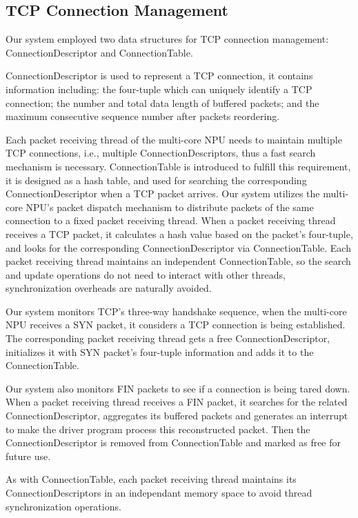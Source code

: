 \documentclass[conference]{IEEEtran}
\begin{document}
\subsection{TCP Connection Management}
Our system employed two data structures for TCP connection management: ConnectionDescriptor and ConnectionTable.

ConnectionDescriptor is used to represent a TCP connection, it contains information including: the four-tuple which can uniquely identify a TCP connection; the number and total data length of buffered packets; and the maximum consecutive sequence number after packets reordering.

Each packet receiving thread of the multi-core NPU needs to maintain multiple TCP connections, i.e., multiple ConnectionDescriptors, thus a fast search mechanism is necessary. ConnectionTable is introduced to fulfill this requirement, it is designed as a hash table, and used for searching the corresponding ConnectionDescriptor when a TCP packet arrives. Our system utilizes the multi-core NPU's packet dispatch mechanism to distribute packets of the same connection to a fixed packet receiving thread. When a packet receiving thread receives a TCP packet, it calculates a hash value based on the packet's four-tuple, and looks for the corresponding ConnectionDescriptor via ConnectionTable. Each packet receiving thread maintains an independent ConnectionTable, so the search and update operations do not need to interact with other threads, synchronization overheads are naturally avoided.

Our system monitors TCP's three-way handshake sequence, when the multi-core NPU receives a SYN packet, it considers a TCP connection is being established. The corresponding packet receiving thread gets a free ConnectionDescriptor, initializes it with SYN packet's four-tuple information and adds it to the ConnectionTable.

Our system also monitors FIN packets to see if a connection is being tared down. When a packet receiving thread receives a FIN packet, it searches for the related ConnectionDescriptor, aggregates its buffered packets and generates an interrupt to make the driver program process this reconstructed packet. Then the ConnectionDescriptor is removed from ConnectionTable and marked as free for future use.

As with ConnectionTable, each packet receiving thread maintains its ConnectionDescriptors in an independant memory space to avoid thread synchronization operations.
\end{document}
